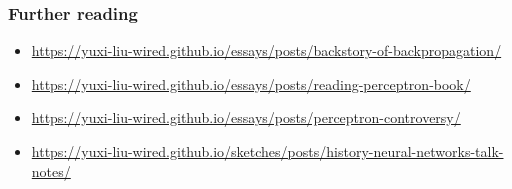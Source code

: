 \documentclass{beamer}
\begin{document}
\begin{frame}
    \frametitle{Further reading}
    \begin{itemize}
        \item \url{https://yuxi-liu-wired.github.io/essays/posts/backstory-of-backpropagation/}
        \item \url{https://yuxi-liu-wired.github.io/essays/posts/reading-perceptron-book/}
        \item \url{https://yuxi-liu-wired.github.io/essays/posts/perceptron-controversy/}
        \item \url{https://yuxi-liu-wired.github.io/sketches/posts/history-neural-networks-talk-notes/}
    \end{itemize}
\end{frame}


\end{document}
